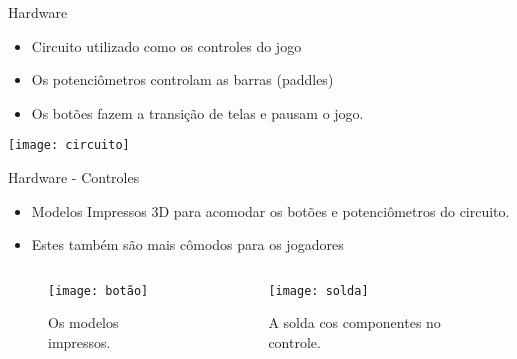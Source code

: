 \begin{frame}[t]{Hardware}

	\begin{itemize}
        \item Circuito utilizado como os controles do jogo
	\item Os potenciômetros controlam as barras (paddles)
	\item Os botões fazem a transição de telas e pausam o jogo.
    \end{itemize}
   
\vspace{0.3cm}
\begin{center}
\texttt{[image: circuito]} 
\end{center}
\end{frame}
\begin{frame}[c]{Hardware - Controles}
 
  \begin{itemize}
      \item Modelos Impressos 3D para acomodar os botões e potenciômetros do circuito.
	\item Estes também são mais cômodos para os jogadores
    \end{itemize}
\vspace{0.3cm}
\begin{columns}
	\begin{column}{0.4\textwidth}
		\begin{figure}
			\centering
    			\texttt{[image: botão]}
    			\caption{Os modelos impressos.}
		\end{figure}
	\end{column}
		\begin{column}{0.4\textwidth}
			\begin{figure}
				\centering
    				\texttt{[image: solda]}
    				\caption{A solda cos componentes no controle.}
			\end{figure}
		\end{column}
	\end{columns}
 \end{frame}
